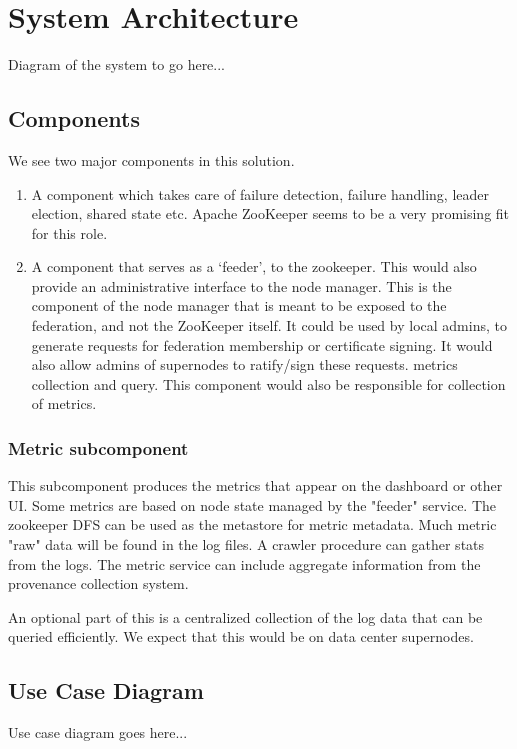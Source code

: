 \documentclass[oneside,12pt]{memoir}
\begin{document}
\section{System Architecture}
Diagram of the system to go here...\\

\subsection{Components}
We see two major components in this solution.
\begin{enumerate}
\item 
A component which takes care of failure detection, failure handling, leader election, shared state etc.
Apache ZooKeeper seems to be a very promising fit for this role.
\item
A component that serves as a `feeder', to the zookeeper. This would also provide an administrative interface to the node manager. This is the component of the node manager that is meant to be exposed to the federation, and not the ZooKeeper itself. It could be used by local admins, to generate requests for federation membership or certificate signing. It would also allow admins of supernodes to ratify/sign these requests.
metrics collection and query. This component would also be responsible for collection of metrics.
\end{enumerate}

\subsubsection{Metric subcomponent}

This subcomponent produces the metrics that appear on the dashboard or other UI.  Some metrics are based on node state managed by the "feeder" service.  The zookeeper DFS can be used as the metastore for metric metadata.  Much metric "raw" data will be found in the log files.  A crawler procedure can gather stats from the logs.   The metric service can include aggregate information from the provenance collection system.



An optional part of this is a centralized collection of the log data that can be queried efficiently.  We expect that this would be on data center supernodes.   


\subsection{Use Case Diagram}
Use case diagram goes here...
\end{document}
